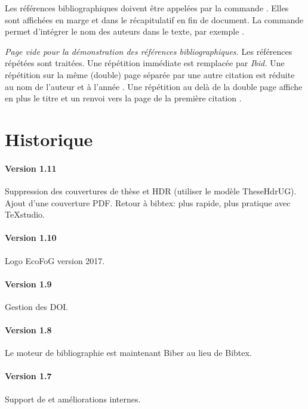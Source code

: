 \documentclass[
  a4paper, %
  11pt, extrafontsizes, %
  onecolumn, %
  openright, %
]{memoir}
\begin{document}
Les références bibliographiques doivent être appelées par la commande . 
Elles sont affichées en marge \autocite{Rao1985} et dans le récapitulatif en fin de document.
La commande  permet d'intégrer le nom des auteurs dans le texte, par exemple \textcite{Rao1985}.

\newpage 
\textit{Page vide pour la démonstration des références bibliographiques.}
\newpage 
Les références répétées \autocite{Pelissier2001} sont traitées.
Une répétition immédiate est remplacée par \textit{Ibid.} \autocite{Pelissier2001}
Une répétition sur la même (double) page séparée par une autre citation \autocite{Rao1985} est réduite au nom de l'auteur et à l'année \autocite{Pelissier2001}.
Une répétition au delà de la double page affiche en plus le titre et un renvoi vers la page de la première citation \autocite{Rao1985}.


\section{Historique}

\paragraph{Version 1.11}
Suppression des couvertures de thèse et HDR (utiliser le modèle TheseHdrUG).
Ajout d'une couverture PDF.
Retour à bibtex: plus rapide, plus pratique avec TeXstudio.

\paragraph{Version 1.10}
Logo EcoFoG version 2017.

\paragraph{Version 1.9}
Gestion des DOI.

\paragraph{Version 1.8}
Le moteur de bibliographie est maintenant Biber au lieu de Bibtex.

\paragraph{Version 1.7}
Support de  et améliorations internes.
\end{document}
